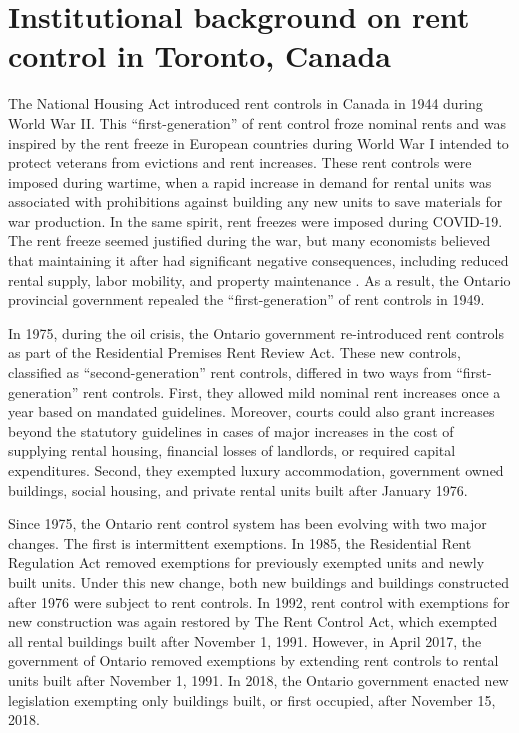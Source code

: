 \documentclass[parskip=full]{article}
\begin{document}
\section{Institutional background on rent control in Toronto, Canada}\label{sec:insitutional_background}



The National Housing Act introduced rent controls in Canada in 1944 during World War II. This “first-generation” of rent control froze nominal rents and was inspired by the rent freeze in European countries during World War I intended to protect veterans from evictions and rent increases. These rent controls were imposed during wartime, when a rapid increase in demand for rental units was associated with prohibitions against building any new units to save materials for war production\citet{downs-1988}. In the same spirit, rent freezes were imposed during COVID-19. The rent freeze seemed justified during the war, but many economists believed that maintaining it after had significant negative consequences, including reduced rental supply, labor mobility, and property maintenance \citep{arnott-1995}. As a result, the Ontario provincial government repealed the “first-generation” of rent controls in 1949.  

In 1975, during the oil crisis, the Ontario government re-introduced rent controls as part of the Residential Premises Rent Review Act. These new controls, classified as “second-generation” rent controls, differed in two ways from “first-generation” rent controls. First, they allowed mild nominal rent increases once a year based on mandated guidelines. Moreover, courts could also grant increases beyond the statutory guidelines in cases of major increases in the cost of supplying rental housing, financial losses of landlords, or required capital expenditures. Second, they exempted luxury accommodation, government owned buildings, social housing, and private rental units built after January 1976.

Since 1975, the Ontario rent control system has been evolving with two major changes. The first is intermittent exemptions. In 1985, the Residential Rent Regulation Act removed exemptions for previously exempted units and newly built units. Under this new change, both new buildings and buildings constructed after 1976 were subject to rent controls. In 1992, rent control with exemptions for new construction was again restored by The Rent Control Act, which exempted all rental buildings built after November 1, 1991. However, in April 2017, the government of Ontario removed exemptions by extending rent controls to rental units built after November 1, 1991. In 2018, the Ontario government enacted new legislation exempting only buildings built, or first occupied, after November 15, 2018.
\end{document}
